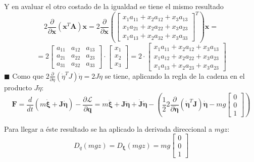 \documentclass[twoside]{article}
\begin{document}
Y en avaluar el otro costado de la igualdad se tiene el mismo resultado
\begin{equation}
2 \frac{\partial}{\partial \pmb{x}}(\pmb{x}^{T}\pmb{A})\pmb{x}=2 \frac{\partial}{\partial \pmb{x}} \left( \left[ \begin{array}{ccc}
x_1a_{11}+x_2a_{12}+x_3a_{13} \\
x_1a_{21}+x_2a_{22}+x_3a_{23} \\
x_1a_{13}+x_2a_{32}+x_3a_{33}
\end{array} \right]^{T} \right)\pmb{x}=
\end{equation}
\begin{equation}
=2\left[\begin{array}{ccc}
a_{11} & a_{12} & a_{13} \\
a_{21} & a_{22} & a_{23} \\
a_{31} & a_{32} & a_{33} 
\end{array} \right]\cdot\left[\begin{array}{c}
x_1 \\
x_2 \\
x_3
\end{array} \right]=2\cdot\left[ \begin{array}{c}
x_1a_{11}+x_2a_{12}+x_3a_{13} \\
x_1a_{12}+x_2a_{22}+x_3a_{23} \\
x_1a_{13}+x_2a_{23}+x_3a_{23}
\end{array} \right]
\end{equation}
\hfill $\blacksquare$ \newpage
Como que $2 \frac{\partial}{\partial \dot{\eta}}(\dot{\eta}^{T}J)\dot{\eta}=2 J \dot{\eta}$ se tiene, aplicando la regla de la cadena en el producto $J\dot{\eta}$:
\begin{equation}
\pmb{F}=\frac{d}{dt}\left(m \dot{\pmb{\xi}}+\pmb{J} \pmb{\dot{\eta}}\right)-\frac{\partial \mathcal{L}}{\partial \pmb{q}} =m\pmb{\ddot{\xi}} + \pmb{J}\pmb{\ddot{\eta}} + \pmb{\dot{J}}\pmb{\dot{\eta}}-\left( \frac{1}{2} 2 \frac{\partial}{\partial \pmb{\dot{\eta}}} ( \pmb{\dot{\eta}}^{T}\pmb{J})\pmb{\dot{\eta}} - mg\left[\begin{array}{c}
0 \\
0 \\
1
\end{array} \right] \right)
\end{equation}

Para llegar a éste resultado se ha aplicado la derivada direccional a $mgz$:
\begin{equation}
D_q(mgz)=D_{\pmb{\xi}}(mgz)=mg \left[ \begin{array}{c}
0 \\
0 \\
1
\end{array} \right]
\end{equation}
\end{document}
